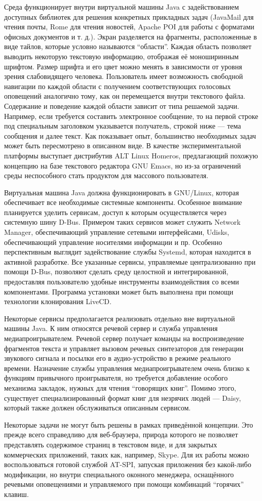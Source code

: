 \documentclass[10pt, a5paper]{article}
\begin{document}
Среда функционирует внутри виртуальной машины Java с задействованием доступных библиотек для решения конкретных прикладных задач (JavaMail для чтения почты, Rome для чтения новостей, Apache POI для работы с форматами офисных документов и т. д.). Экран разделяется на фрагменты, расположенные в виде тайлов, которые условно называются ``области''. Каждая область позволяет выводить некоторую текстовую информацию, отображая её моноширинным шрифтом. Размер шрифта и его цвет можно менять в зависимости от уровня зрения слабовидящего человека. Пользователь имеет возможность свободной навигации по каждой области с получением соответствующих голосовых оповещений аналогично тому, как он перемещается внутри текстового файла. Содержание и поведение каждой области зависит от типа решаемой задачи. Например, если требуется составить электронное сообщение, то на первой строке под специальным заголовком указывается получатель, строкой ниже — тема сообщения и далее текст. Как показывает опыт, большинство необходимых задач может быть пересмотрено в описанном виде. В качестве экспериментальной платформы выступает дистрибутив ALT Linux Homeros, предлагающий похожую концепцию на базе текстового редактора GNU Emacs, но из-за ограничений среды неспособного стать продуктом для массового пользователя.

Виртуальная машина Java должна функционировать в GNU/Linux, которая обеспечивает все необходимые системные компоненты. Особенное внимание планируется уделить сервисам, доступ к которым осуществляется через системную шину D-Bus. Примером таких сервисов может служить Network Manager, обеспечивающий управление сетевыми интерфейсами, Udisks, обеспечивающий управление носителями информации и пр. Особенно перспективным выглядит задействование службы Systemd, которая находится в активной разработке. Все указанные сервисы, управляемые централизованно при помощи D-Bus, позволяют сделать среду целостной и интегрированной, предоставляя пользователю удобные инструменты взаимодействия со всеми компонентами. Программа установки может быть выполнена при помощи технологии клонирования LiveCD.

Некоторые сервисы предполагается реализовать отдельно вне виртуальной машины Java. К ним относятся речевой сервер и служба управления медиапроигрывателем. Речевой сервер получает команды на воспроизведение фрагментов текста и управляет вызовом речевых синтезаторов для  генерации звукового сигнала и посылки его в аудио-устройство в режиме реального времени. Назначение службы управления медиапроигрывателем очень близко к функциям привычного проигрывателя, но требуется добавление особого механизма закладок, нужных для чтения ``говорящих книг''. Помимо этого, существует специализированный формат книг для незрячих людей — Daisy, который также должен обслуживаться описанным сервисом.

Некоторые задачи не могут быть решены в рамках приведённой концепции. Это прежде всего справедливо для веб-браузера, природа которого не позволяет представлять содержимое страниц в текстовом виде, и для закрытых коммерческих приложений, таких как, например, Skype. Для их работы можно воспользоваться готовой службой AT-SPI, запуская приложения без какой-либо модификации, но внутри специального оконного менеджера, оснащённого речевыми оповещениями и управляемого при помощи комбинаций ``горячих'' клавиш.
\end{document}
